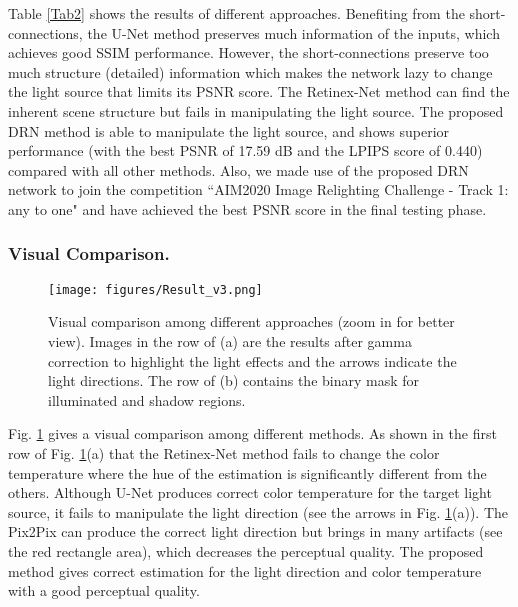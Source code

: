 \documentclass[runningheads]{llncs}
\begin{document}
Table \ref{Tab2} shows the results of different approaches.  Benefiting from the short-connections, the U-Net method preserves much information of the inputs, which achieves good SSIM performance. However, the short-connections preserve too much structure (detailed) information which makes the network lazy to change the light source that limits its PSNR score. The Retinex-Net method can find the inherent scene structure but fails in manipulating the light source. The proposed DRN method is able to manipulate the light source, and shows superior performance (with the best PSNR of 17.59 dB and the LPIPS score of 0.440) compared with all other methods. Also, we made use of the proposed DRN network to join the competition ``AIM2020 Image Relighting Challenge - Track 1: any to one" and have achieved the best PSNR score in the final testing phase.

\vskip -0.5cm
\baselineskip 
\subsubsection{Visual Comparison.} 

\begin{figure}[t]
    \centering
    \texttt{[image: figures/Result\_v3.png]}
   \baselineskip 
    \caption{Visual comparison among different approaches (zoom in for better view). Images in the  row of (a) are the results after gamma correction to highlight the light effects and the arrows indicate the light directions. The  row of (b) contains the binary mask for illuminated and shadow regions.}
    \label{fig:res}
   \baselineskip 
\end{figure}


Fig. \ref{fig:res} gives a visual comparison among different methods. As shown in the first row of Fig. \ref{fig:res}(a) that the Retinex-Net method \cite{RetinexNet} fails to change the color temperature where the hue of the estimation is significantly different from the others. Although U-Net \cite{UNet} produces correct color temperature for the target light source, it fails to manipulate the light direction (see the arrows in Fig. \ref{fig:res}(a)). The Pix2Pix \cite{pix2pix} can produce the correct light direction but brings in many artifacts (see the red rectangle area), which decreases the perceptual quality. The proposed method gives correct estimation for the light direction and color temperature with a good perceptual quality. 
\end{document}
